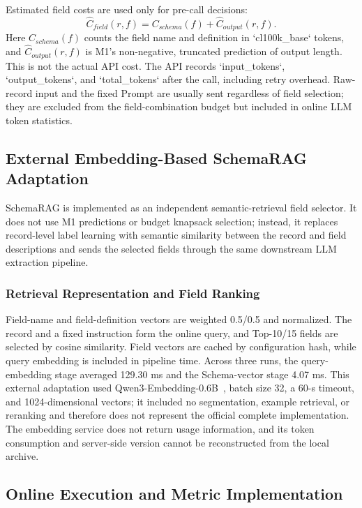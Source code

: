 \documentclass[runningheads]{llncs}
\newcommand{\method}{M1}
\newcommand{\schemarag}{SchemaRAG}
\begin{document}
Estimated field costs are used only for pre-call decisions:
\begin{equation}
 \widehat{C}_{field}(r,f)=C_{schema}(f)+\widehat{C}_{output}(r,f).
\end{equation}
Here $C_{schema}(f)$ counts the field name and definition in `cl100k_base` tokens, and $\widehat{C}_{output}(r,f)$ is \method{}'s non-negative, truncated prediction of output length. This is not the actual API cost. The API records `input_tokens`, `output_tokens`, and `total_tokens` after the call, including retry overhead. Raw-record input and the fixed Prompt are usually sent regardless of field selection; they are excluded from the field-combination budget but included in online LLM token statistics.

\subsection{External Embedding-Based SchemaRAG Adaptation}

\schemarag{} is implemented as an independent semantic-retrieval field selector. It does not use \method{} predictions or budget knapsack selection; instead, it replaces record-level label learning with semantic similarity between the record and field descriptions and sends the selected fields through the same downstream LLM extraction pipeline.

\subsubsection{Retrieval Representation and Field Ranking}

Field-name and field-definition vectors are weighted 0.5/0.5 and normalized. The record and a fixed instruction form the online query, and Top-10/15 fields are selected by cosine similarity. Field vectors are cached by configuration hash, while query embedding is included in pipeline time. Across three runs, the query-embedding stage averaged 129.30 ms and the Schema-vector stage 4.07 ms. This external adaptation used Qwen3-Embedding-0.6B~\cite{zhang2025qwen3embedding}, batch size 32, a 60-s timeout, and 1024-dimensional vectors; it included no segmentation, example retrieval, or reranking and therefore does not represent the official complete implementation. The embedding service does not return usage information, and its token consumption and server-side version cannot be reconstructed from the local archive.

\subsection{Online Execution and Metric Implementation}
\end{document}
